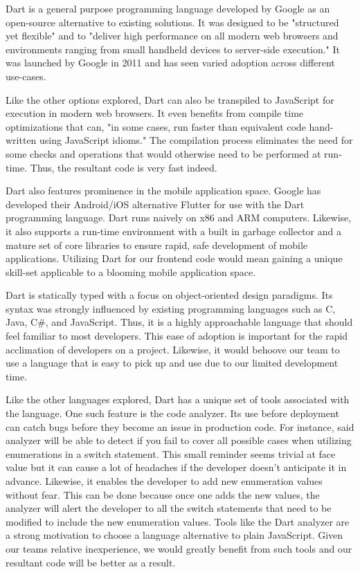 \documentclass[12pt]{report}
\begin{document}
\begin{enumerate}
Dart is a general purpose programming language developed by Google as an open-source alternative to existing solutions.\cite{dartlaunch} It was designed to be "structured yet flexible" and to "deliver high performance on all modern web browsers and environments ranging from small handheld devices to server-side execution."\cite{dartlaunch} It was launched by Google in 2011 and has seen varied adoption across different use-cases.

Like the other options explored, Dart can also be transpiled to JavaScript for execution in modern web browsers. It even benefits from compile time optimizations that can, "in some cases, run faster than equivalent code hand-written using JavaScript idioms."\cite{darttalk} The compilation process eliminates the need for some checks and operations that would otherwise need to be performed at run-time. Thus, the resultant code is very fast indeed.

Dart also features prominence in the mobile application space. Google has developed their Android/iOS alternative Flutter for use with the Dart programming language.\cite{darthomepage} Dart runs naively on x86 and ARM computers. Likewise, it also supports a run-time environment with a built in garbage collector and a mature set of core libraries to ensure rapid, safe development of mobile applications. Utilizing Dart for our frontend code would mean gaining a unique skill-set applicable to a blooming mobile application space.

Dart is statically typed with a focus on object-oriented design paradigms. Its syntax was strongly influenced by existing programming languages such as C, Java, C\#, and JavaScript. Thus, it is a highly approachable language that should feel familiar to most developers. This ease of adoption is important for the rapid acclimation of developers on a project. Likewise, it would behoove our team to use a language that is easy to pick up and use due to our limited development time.

Like the other languages explored, Dart has a unique set of tools associated with the language. One such feature is the code analyzer. Its use before deployment can catch bugs before they become an issue in production code. For instance, said analyzer will be able to detect if you fail to cover all possible cases when utilizing enumerations in a switch statement. This small reminder seems trivial at face value but it can cause a lot of headaches if the developer doesn't anticipate it in advance. Likewise, it enables the developer to add new enumeration values without fear. This can be done because once one adds the new values, the analyzer will alert the developer to all the switch statements that need to be modified to include the new enumeration values. Tools like the Dart analyzer are a strong motivation to choose a language alternative to plain JavaScript. Given our teams relative inexperience, we would greatly benefit from such tools and our resultant code will be better as a result.


\end{enumerate}
\end{document}
